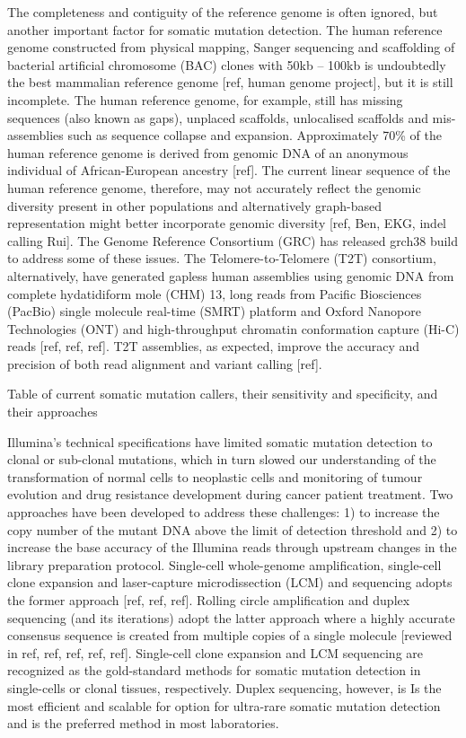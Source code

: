The completeness and contiguity of the reference genome is often ignored, but another important factor for somatic mutation detection. The human reference genome constructed from physical mapping, Sanger sequencing and scaffolding of bacterial artificial chromosome (BAC) clones with 50kb – 100kb is undoubtedly the best mammalian reference genome [ref, human genome project], but it is still incomplete. The human reference genome, for example, still has missing sequences (also known as gaps), unplaced scaffolds, unlocalised scaffolds and mis-assemblies such as sequence collapse and expansion. Approximately 70\% of the human reference genome is derived from genomic DNA of an anonymous individual of African-European ancestry [ref]. The current linear sequence of the human reference genome, therefore, may not accurately reflect the genomic diversity present in other populations and alternatively graph-based representation might better incorporate genomic diversity [ref, Ben, EKG, indel calling Rui]. The Genome Reference Consortium (GRC) has released grch38 build to address some of these issues. The Telomere-to-Telomere (T2T) consortium, alternatively, have generated gapless human assemblies using genomic DNA from complete hydatidiform mole (CHM) 13, long reads from Pacific Biosciences (PacBio) single molecule real-time (SMRT) platform and Oxford Nanopore Technologies (ONT) and high-throughput chromatin conformation capture (Hi-C) reads [ref, ref, ref]. T2T assemblies, as expected, improve the accuracy and precision of both read alignment and variant calling [ref]. 

Table of current somatic mutation callers, their sensitivity and specificity, and their approaches

Illumina’s technical specifications have limited somatic mutation detection to clonal or sub-clonal mutations, which in turn slowed our understanding of the transformation of normal cells to neoplastic cells and monitoring of tumour evolution and drug resistance development during cancer patient treatment. Two approaches have been developed to address these challenges: 1) to increase the copy number of the mutant DNA above the limit of detection threshold and 2) to increase the base accuracy of the Illumina reads through upstream changes in the library preparation protocol. Single-cell whole-genome amplification, single-cell clone expansion and laser-capture microdissection (LCM) and sequencing adopts the former approach [ref, ref, ref]. Rolling circle amplification and duplex sequencing (and its iterations) adopt the latter approach where a highly accurate consensus sequence is created from multiple copies of a single molecule [reviewed in ref, ref, ref, ref, ref]. Single-cell clone expansion and LCM sequencing are recognized as the gold-standard methods for somatic mutation detection in single-cells or clonal tissues, respectively. Duplex sequencing, however, is 
Is the most efficient and scalable for option for ultra-rare somatic mutation detection and is the preferred method in most laboratories. 

